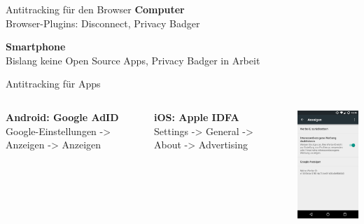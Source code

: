 \documentclass[12pt, xcolor={svgnames,table}]{beamer}
\begin{document}
\begin{frame}{Antitracking für den Browser}
  \textbf{Computer}\\
  Browser-Plugins: Disconnect, Privacy Badger\\
  \vspace{0.5cm}

  \textbf{Smartphone}\\
  Bislang keine Open Source Apps, Privacy Badger in Arbeit
\end{frame}

\begin{frame}{Antitracking für Apps}
  \begin{columns}
    \column{5.5cm}
    \footnotesize

    \textbf{Android: Google AdID}\\
    Google-Einstellungen -> Anzeigen -> Anzeigen\\
    \vspace{0.5cm}

    \textbf{iOS: Apple IDFA}\\
    Settings -> General -> About -> Advertising\\
    \vspace{0.5cm}

    \column{5cm}

    \begin{center}
      \includegraphics[width=3.5cm]{img/google-adid.png}
    \par\end{center}
  \end{columns}
\end{frame}
\end{document}
